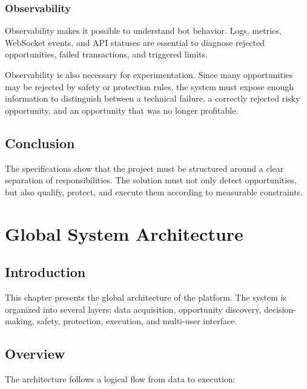 \documentclass[12pt,a4paper]{report}
\begin{document}
\subsection{Observability}

Observability makes it possible to understand bot behavior. Logs, metrics, WebSocket events, and API statuses are essential to diagnose rejected opportunities, failed transactions, and triggered limits.

Observability is also necessary for experimentation. Since many opportunities may be rejected by safety or protection rules, the system must expose enough information to distinguish between a technical failure, a correctly rejected risky opportunity, and an opportunity that was no longer profitable.

\section{Conclusion}

The specifications show that the project must be structured around a clear separation of responsibilities. The solution must not only detect opportunities, but also qualify, protect, and execute them according to measurable constraints.

\chapter{Global System Architecture}
\label{chap:architecture}

\section{Introduction}

This chapter presents the global architecture of the platform. The system is organized into several layers: data acquisition, opportunity discovery, decision-making, safety, protection, execution, and multi-user interface.

\section{Overview}

The architecture follows a logical flow from data to execution:
\end{document}
